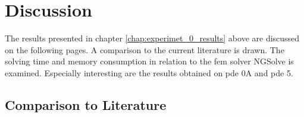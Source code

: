 \documentclass[./\jobname.tex]{subfiles}
\begin{document}
\begin{figure}[H]
	\centering
	\noindent{}
	\label{fig:serial_jade_memory_boxplot}
\end{figure}

\section{Discussion}

The results presented in chapter \ref{chap:experimet_0_results} above are discussed on the following pages. A comparison to the current literature is drawn. The solving time and memory consumption in relation to the \gls{fem} solver NGSolve is examined. Especially interesting are the results obtained on \gls{pde} 0A and \gls{pde} 5. 

\subsection{Comparison to Literature}
\end{document}
